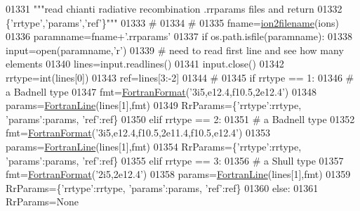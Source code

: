 \begin{DoxyCode}
{{{{{{{{{{{{01331     \textcolor{stringliteral}{"""read chianti radiative recombination .rrparams files and return}
01332 \textcolor{stringliteral}{        \{'rrtype','params','ref'\}"""}
01333     \textcolor{comment}{#}
01334     \textcolor{comment}{#}
01335     fname=\hyperlink{namespacepyneb_1_1utils_1_1__chianti__tools_ad4bc7b577fd4c3819ceb00b0a444351b}{ion2filename}(ions)
01336     paramname=fname+\textcolor{stringliteral}{'.rrparams'}
01337     \textcolor{keywordflow}{if} os.path.isfile(paramname):
01338         input=open(paramname,\textcolor{stringliteral}{'}\textcolor{stringliteral}{r')}
01339 \textcolor{stringliteral}{        }\textcolor{comment}{#  need to read first line and see how many elements}
01340         lines=input.readlines()
01341         input.close()
01342         rrtype=int(lines[0])
01343         ref=lines[3:-2]
01344         \textcolor{comment}{#}
01345         \textcolor{keywordflow}{if} rrtype == 1:
01346             \textcolor{comment}{# a Badnell type}
01347             fmt=\hyperlink{classpyneb_1_1utils_1_1_fortran_format_1_1_fortran_format}{FortranFormat}(\textcolor{stringliteral}{'3i5,e12.4,f10.5,2e12.4'})
01348             params=\hyperlink{classpyneb_1_1utils_1_1_fortran_format_1_1_fortran_line}{FortranLine}(lines[1],fmt)
01349             RrParams=\{\textcolor{stringliteral}{'rrtype'}:rrtype, \textcolor{stringliteral}{'params'}:params, \textcolor{stringliteral}{'ref'}:ref\}
01350         \textcolor{keywordflow}{elif} rrtype == 2:
01351             \textcolor{comment}{# a Badnell type}
01352             fmt=\hyperlink{classpyneb_1_1utils_1_1_fortran_format_1_1_fortran_format}{FortranFormat}(\textcolor{stringliteral}{'3i5,e12.4,f10.5,2e11.4,f10.5,e12.4'})
01353             params=\hyperlink{classpyneb_1_1utils_1_1_fortran_format_1_1_fortran_line}{FortranLine}(lines[1],fmt)
01354             RrParams=\{\textcolor{stringliteral}{'rrtype'}:rrtype, \textcolor{stringliteral}{'params'}:params, \textcolor{stringliteral}{'ref'}:ref\}
01355         \textcolor{keywordflow}{elif} rrtype == 3:
01356             \textcolor{comment}{# a Shull type}
01357             fmt=\hyperlink{classpyneb_1_1utils_1_1_fortran_format_1_1_fortran_format}{FortranFormat}(\textcolor{stringliteral}{'2i5,2e12.4'})
01358             params=\hyperlink{classpyneb_1_1utils_1_1_fortran_format_1_1_fortran_line}{FortranLine}(lines[1],fmt)
01359             RrParams=\{\textcolor{stringliteral}{'rrtype'}:rrtype, \textcolor{stringliteral}{'params'}:params, \textcolor{stringliteral}{'ref'}:ref\}
01360         \textcolor{keywordflow}{else}:
01361             RrParams=\textcolor{keywordtype}{None}
}}}}}}}}}}}}
\end{DoxyCode}
